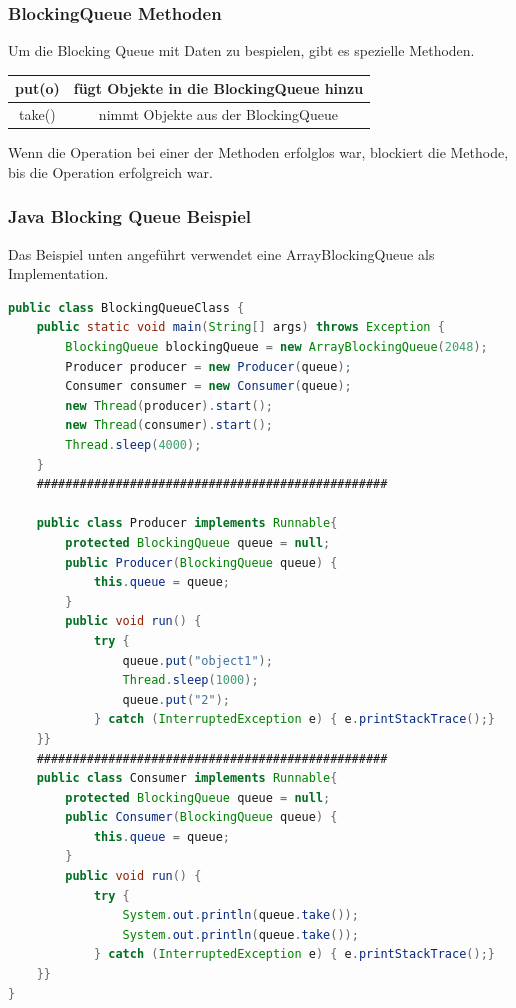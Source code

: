 \subsubsection{BlockingQueue Methoden}
Um die Blocking Queue mit Daten zu bespielen, gibt es spezielle Methoden.
 
\begin{center}
    \begin{tabular}{ |c|c| }
     \hline
     put(o) & fügt Objekte in die BlockingQueue hinzu \\
     \hline
     take() & nimmt Objekte aus der BlockingQueue \\
     \hline
    \end{tabular}
    \end{center}
 
Wenn die Operation bei einer der Methoden erfolglos war, blockiert die Methode, bis die Operation erfolgreich war. \cite{javaBlockingQueue}
 
\subsubsection{Java Blocking Queue Beispiel}
Das Beispiel unten angeführt verwendet eine ArrayBlockingQueue als Implementation.
 
 
 
\begin{lstlisting}[language=java,caption=Java BlockingQueue Beispiel,label=lst:impl:blockingQueue]
    public class BlockingQueueClass {
    public static void main(String[] args) throws Exception {
        BlockingQueue blockingQueue = new ArrayBlockingQueue(2048);
        Producer producer = new Producer(queue);
        Consumer consumer = new Consumer(queue);
        new Thread(producer).start();
        new Thread(consumer).start();
        Thread.sleep(4000);
    }
    #################################################
 
    public class Producer implements Runnable{
        protected BlockingQueue queue = null;
        public Producer(BlockingQueue queue) {
            this.queue = queue;
        }
        public void run() {
            try {
                queue.put("object1");
                Thread.sleep(1000);
                queue.put("2");
            } catch (InterruptedException e) { e.printStackTrace();}
    }}
    #################################################
    public class Consumer implements Runnable{
        protected BlockingQueue queue = null;
        public Consumer(BlockingQueue queue) {
            this.queue = queue;
        }
        public void run() {
            try {
                System.out.println(queue.take());
                System.out.println(queue.take());
            } catch (InterruptedException e) { e.printStackTrace();}
    }}
}
\end{lstlisting}
\cite{javaBlockingQueue}
 
